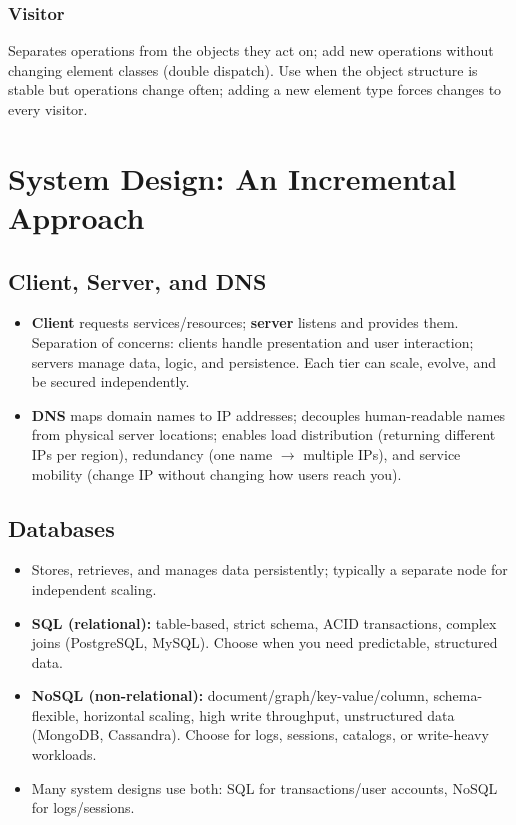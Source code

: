 \documentclass[hidelinks]{article}
\begin{document}
\subsubsection*{Visitor}
Separates operations from the objects they act on; add new operations without changing element
classes (double dispatch). Use when the object structure is stable but operations change often;
adding a new element type forces changes to every visitor.


\section{System Design: An Incremental Approach}

\subsection{Client, Server, and DNS}
\begin{itemize}
  \item \textbf{Client} requests services/resources; \textbf{server} listens and provides them.
        Separation of concerns: clients handle presentation and user interaction; servers manage
        data, logic, and persistence. Each tier can scale, evolve, and be secured independently.
  \item \textbf{DNS} maps domain names to IP addresses; decouples human-readable names from
        physical server locations; enables load distribution (returning different IPs per region),
        redundancy (one name $\to$ multiple IPs), and service mobility (change IP without changing
        how users reach you).
\end{itemize}

\subsection{Databases}
\begin{itemize}
  \item Stores, retrieves, and manages data persistently; typically a separate node for independent
        scaling.
  \item \textbf{SQL (relational):} table-based, strict schema, ACID transactions, complex joins
        (PostgreSQL, MySQL). Choose when you need predictable, structured data.
  \item \textbf{NoSQL (non-relational):} document/graph/key-value/column, schema-flexible,
        horizontal scaling, high write throughput, unstructured data (MongoDB, Cassandra). Choose
        for logs, sessions, catalogs, or write-heavy workloads.
  \item Many system designs use both: SQL for transactions/user accounts, NoSQL for logs/sessions.
\end{itemize}
\end{document}
